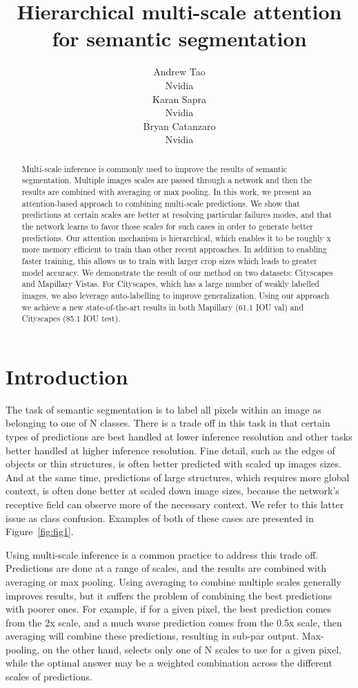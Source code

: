 \documentclass{article}
\title{Hierarchical multi-scale attention for semantic segmentation}
\author{
  Andrew Tao \\
  Nvidia\\
\And
 Karan Sapra \\
 Nvidia\\
   \And
 Bryan Catanzaro \\
 Nvidia\\
}
\begin{document}
\maketitle

\begin{abstract}
Multi-scale inference is commonly used to improve the results of semantic segmentation. Multiple images scales are passed through a network and then the results are combined with averaging or max pooling. In this work, we present an attention-based approach to combining multi-scale predictions. We show that predictions at certain scales are better at resolving particular failures modes, and that the network learns to favor those scales for such cases in order to generate better predictions. Our attention mechanism is hierarchical, which enables it to be roughly x more memory efficient to train than other recent approaches. In addition to enabling faster training, this allows us to train with larger crop sizes which leads to greater model accuracy. We demonstrate the result of our method on two datasets: Cityscapes and Mapillary Vistas. For Cityscapes, which has a large number of weakly labelled images, we also leverage auto-labelling to improve generalization. Using our approach we achieve a new state-of-the-art results in both Mapillary (61.1 IOU val) and Cityscapes (85.1 IOU test). 
\end{abstract}




\section{Introduction}
The task of semantic segmentation is to label all pixels within an image as belonging to one of N classes. There is a trade off in this task in that certain types of predictions are best handled at lower inference resolution and other tasks better handled at higher inference resolution. Fine detail, such as the edges of objects or thin structures, is often better predicted with scaled up images sizes. And at the same time, predictions of large structures, which requires more global context, is often done better at scaled down image sizes, because the network's receptive field can observe more of the necessary context. We refer to this latter issue as class confusion. Examples of both of these cases are presented in Figure~\ref{fig:fig1}.

Using multi-scale inference is a common practice to address this trade off. Predictions are done at a range of scales, and the results are combined with averaging or max pooling. Using averaging to combine multiple scales generally improves results, but it suffers the problem of combining the best predictions with poorer ones. For example, if for a given pixel, the best prediction comes from the 2x scale, and a much worse prediction comes from the 0.5x scale, then averaging will combine these predictions, resulting in sub-par output. Max-pooling, on the other hand, selects only one of N scales to use for a given pixel, while the optimal answer may be a weighted combination across the different scales of predictions.
\end{document}
